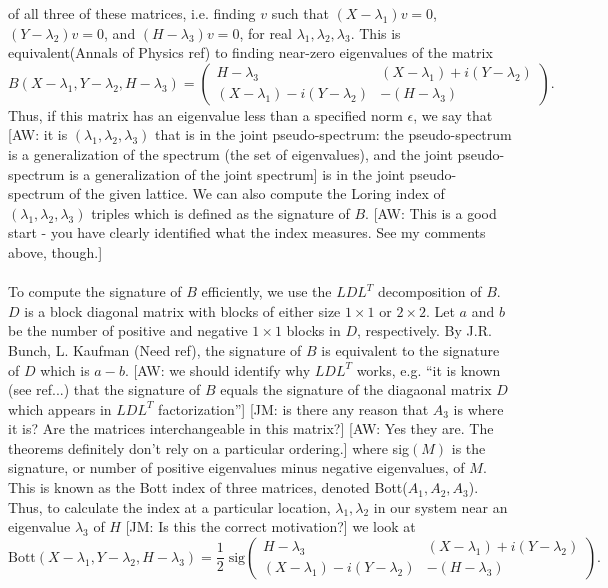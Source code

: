 \documentclass[a4paper]{article}
\newcommand{\aw}[1]{{\color{blue} [AW: #1]}}
\newcommand{\jm}[1]{{\color{red} [JM: #1]}}
\begin{document}
 of all three of these matrices, i.e. finding $v$ such that $(X - \lambda_1)v = 0$, $(Y - \lambda_2)v = 0$, and $(H-\lambda_3)v = 0$, for real $\lambda_1,\lambda_2,\lambda_3$. This is equivalent(Annals of Physics ref) to finding near-zero eigenvalues of the matrix
$$B(X - \lambda_1, Y - \lambda_2, H - \lambda_3) =
\begin{pmatrix}
H - \lambda_3 & (X - \lambda_1) + i(Y - \lambda_2)\\
(X - \lambda_1) - i(Y - \lambda_2) & - (H - \lambda_3)
\end{pmatrix}.$$
Thus, if this matrix has an eigenvalue less than a specified norm $\epsilon$, we say that \aw{it is $(\lambda_1,\lambda_2,\lambda_3)$ that is in the joint pseudo-spectrum: the pseudo-spectrum is a generalization of the spectrum (the set of eigenvalues), and the joint pseudo-spectrum is a generalization of the joint spectrum} is in the joint pseudo-spectrum of the given lattice. We can also compute the Loring index of $(\lambda_1,\lambda_2,\lambda_3)$ triples which is defined as the signature of $B$. \aw{This is a good start - you have clearly identified what the index measures. See my comments above, though.} \\\\
To compute the signature of $B$ efficiently, we use the $LDL^T$ decomposition of $B$. $D$ is a block diagonal matrix with blocks of either size $1 \times 1$ or $2 \times 2$. Let $a$ and $b$ be the number of positive and negative $1 \times 1$ blocks in $D$, respectively. By J.R. Bunch, L. Kaufman (Need ref), the signature of $B$ is equivalent to the signature of $D$ which is $a - b$. \aw{we should identify why $L D L^T$ works, e.g. ``it is known (see ref...) that the signature of $B$ equals the signature of the diagaonal matrix $D$ which appears in $L D L^T$ factorization''}
\jm{is there any reason that $A_3$ is where it is? Are the matrices interchangeable in this matrix?} \aw{Yes they are. The theorems definitely don't rely on a particular ordering.}
where sig$(M)$ is the signature, or number of positive eigenvalues minus negative eigenvalues, of $M$.
This is known as the Bott index of three matrices, denoted Bott($A_1,A_2,A_3$).\\
Thus, to calculate the index at a particular location, $\lambda_1,\lambda_2$ in our system near an eigenvalue $\lambda_3$ of $H$ \jm{Is this the correct motivation?} we look at
$$\text{Bott}(X-\lambda_1,Y - \lambda_2, H - \lambda_3) = \frac{1}{2}\; \text{sig}\begin{pmatrix}
H - \lambda_3 & (X - \lambda_1) + i(Y - \lambda_2)\\
(X - \lambda_1) - i(Y - \lambda_2) & - (H - \lambda_3)
\end{pmatrix}.$$
\end{document}
